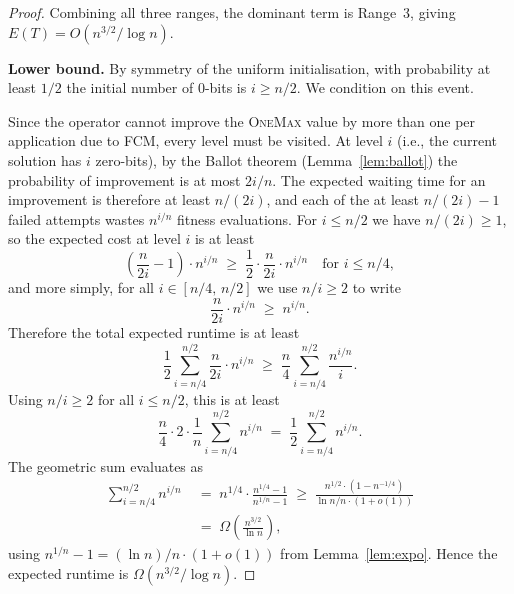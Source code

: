 \begin{proof}
Combining all three ranges, the dominant term is Range~3, giving $E(T)=O(n^{3/2}/\log n)$.

\medskip
\noindent\textbf{Lower bound.}
By symmetry of the uniform initialisation, with probability at least $1/2$ the initial number of 0-bits is $i\geq n/2$. We condition on this event.

Since the operator cannot improve the \textsc{OneMax} value by more than one per application due to FCM, every level must be visited. At level $i$ (i.e., the current solution has $i$ zero-bits), by the Ballot theorem (Lemma~\ref{lem:ballot}) the probability of improvement is at most $2i/n$. The expected waiting time for an improvement is therefore at least $n/(2i)$, and each of the at least $n/(2i)-1$ failed attempts wastes $n^{i/n}$ fitness evaluations. For $i\leq n/2$ we have $n/(2i)\geq 1$, so the expected cost at level $i$ is at least
\[
\left(\frac{n}{2i}-1\right)\cdot n^{i/n}
\;\geq\; \frac{1}{2}\cdot\frac{n}{2i}\cdot n^{i/n}
\quad\text{for }i\leq n/4,
\]
and more simply, for all $i\in[n/4,\,n/2]$ we use $n/i\geq 2$ to write
\[
\frac{n}{2i}\cdot n^{i/n}\;\geq\; n^{i/n}.
\]
Therefore the total expected runtime is at least
\[
\frac{1}{2}\sum_{i=n/4}^{n/2}\frac{n}{2i}\cdot n^{i/n}
\;\geq\; \frac{n}{4}\sum_{i=n/4}^{n/2}\frac{n^{i/n}}{i}.
\]
Using $n/i\geq 2$ for all $i\leq n/2$, this is at least
\[
\frac{n}{4}\cdot 2\cdot\frac{1}{n}\sum_{i=n/4}^{n/2} n^{i/n}
\;=\;\frac{1}{2}\sum_{i=n/4}^{n/2} n^{i/n}.
\]
The geometric sum evaluates as
\begin{align*}
\sum_{i=n/4}^{n/2} n^{i/n}
\;&=\; n^{1/4}\cdot\frac{n^{1/4}-1}{n^{1/n}-1}
\;\geq\; \frac{n^{1/2}\cdot(1-n^{-1/4})}{\ln n/n\cdot(1+o(1))}\\
\;&=\;\Omega\!\left(\frac{n^{3/2}}{\ln n}\right),
\end{align*}
using $n^{1/n}-1=(\ln n)/n\cdot(1+o(1))$ from Lemma~\ref{lem:expo}.
Hence the expected runtime is $\Omega(n^{3/2}/\log n)$.
\end{proof}


%
%
%
%
